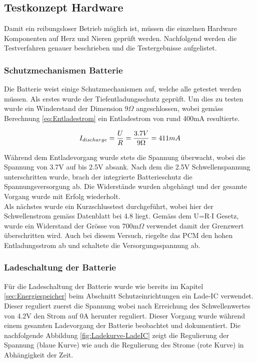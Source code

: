 \subsection{Testkonzept Hardware}\label{sec:testkonzeptHardware}
Damit ein reibungsloser Betrieb möglich ist, müssen die einzelnen Hardware Komponenten auf Herz und Nieren geprüft werden. Nachfolgend werden die Testverfahren genauer beschrieben und die Testergebnisse aufgelistet.

\subsubsection*{Schutzmechanismen Batterie}\label{sec:batterie}
Die Batterie weist einige Schutzmechanismen auf, welche alle getestet werden müssen. Als erstes wurde der Tiefentladungsschutz geprüft. Um dies zu testen wurde ein Winderstand der Dimension 9$\Omega$ angeschlossen, wobei gemäss Berechnung \ref{eq:Entladestrom} ein Entladestrom von rund 400mA resultierte.

\begin{equation}
\centering
I_{discharge}=\frac{U}{R}=\frac{3.7V}{9\Omega }= 411mA
\label{eq:Entladestrom}
\end{equation}

Während dem Entladevorgang wurde stets die Spannung überwacht, wobei die Spannung von 3.7V auf bis 2.5V absank. Nach dem die 2.5V Schwellenspannung unterschritten wurde, brach der integrierte Batterieschutz die Spannungsversorgung ab. Die Widerstände wurden abgehängt und der gesamte Vorgang wurde mit Erfolg wiederholt.
\\
Als nächstes wurde ein Kurzschlusstest durchgeführt, wobei hier der Schwellenstrom gemäss Datenblatt bei 4.8 liegt. Gemäss dem U=R$\cdot$I Gesetz, wurde ein Widerstand der Grösse von 700m$\Omega$ verwendet damit der Grenzwert überschritten wird. Auch bei diesem Versuch, riegelte das PCM den hohen Entladungsstrom ab und schaltete die Versorgungsspannung ab.

\subsubsection*{Ladeschaltung der Batterie}\label{sec:batterie}
Für die Ladeschaltung der Batterie wurde wie bereits im Kapitel \ref{sec:Energiespeicher} beim Abschnitt Schutzeinrichtungen ein Lade-IC verwendet. Dieser reguliert zuerst die Spannung wobei nach Erreichung des Schwellenwertes von 4.2V den Strom auf 0A herunter reguliert. Dieser Vorgang wurde während einem gesamten Ladevorgang der Batterie beobachtet und dokumentiert. Die nachfolgende Abbildung \ref{fig:Ladekurve-LadeIC} zeigt die Regulierung der Spannung (blaue Kurve) wie auch die Regulierung des Strome (rote Kurve) in Abhängigkeit der Zeit.

